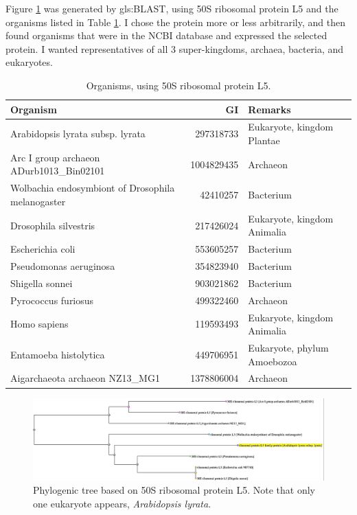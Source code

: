 \documentclass[]{article}
\begin{document}
Figure \ref{fig:Phylo1} was generated by \gls{gls:BLAST}, using 50S ribosomal protein L5 and the organisms listed in Table \ref{tab:organisms}. I chose the protein more or less arbitrarily, and then found organisms that were in the NCBI database and expressed the selected protein. I wanted representatives of all 3 super-kingdoms, archaea, bacteria, and eukaryotes.

\begin{table}[H]
	\caption{Organisms, using 50S ribosomal protein L5.}\label{tab:organisms}
	\centering
	\begin{tabular}{|l |r | p{5cm} |}
		\hline
		\textbf{Organism} & \textbf{GI} & \textbf{Remarks}\\ \hline
		Arabidopsis lyrata subsp. lyrata &297318733 & Eukaryote,  kingdom Plantae \\ \hline
		Arc I group archaeon ADurb1013\_Bin02101&1004829435&Archaeon\\ \hline
		Wolbachia endosymbiont of Drosophila melanogaster  &42410257 &Bacterium \\ \hline
		Drosophila silvestris&217426024&Eukaryote, kingdom Animalia\\\hline
		Escherichia coli &553605257 & Bacterium\\ \hline
		Pseudomonas aeruginosa &354823940 & Bacterium\\ \hline
		Shigella sonnei &903021862 &Bacterium \\ \hline
		Pyrococcus furiosus &499322460 &Archaeon \\ \hline
		Homo sapiens & 119593493&Eukaryote, kingdom Animalia  \\ \hline
		Entamoeba histolytica  &449706951&Eukaryote, phylum Amoebozoa\\ \hline
		Aigarchaeota archaeon NZ13\_MG1&1378806004&Archaeon\\ \hline
	\end{tabular}
\end{table}

\begin{figure}[H]
	\caption{Phylogenic tree based on 50S ribosomal protein L5.  Note that only one eukaryote appears, \textit{Arabidopsis lyrata}.}\label{fig:Phylo1}
	\includegraphics[width=\textwidth]{Phylo1}
\end{figure}
\end{document}
